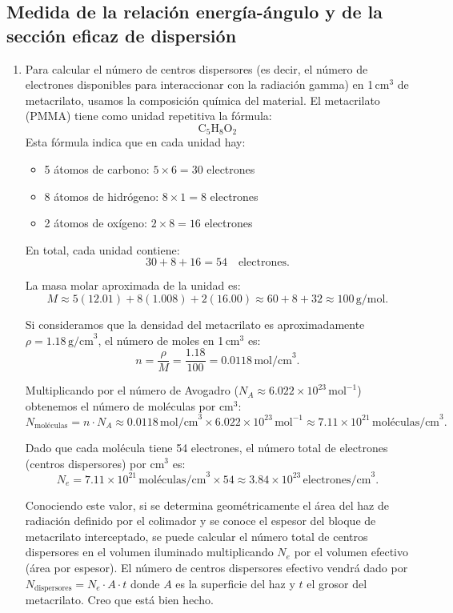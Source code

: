 \documentclass[11pt]{article}
\begin{document}
\subsection{Medida de la relación energía-ángulo y de la sección eficaz de dispersión}

\begin{enumerate}[label=\alph*)]
    \item 
    Para calcular el número de centros dispersores (es decir, el número de electrones disponibles para interaccionar con la radiación gamma) en 1\,cm$^3$ de metacrilato, usamos la composición química del material. El metacrilato (PMMA) tiene como unidad repetitiva la fórmula:
    \[
    \mathrm{C_5H_8O_2}
    \]
    Esta fórmula indica que en cada unidad hay:
    \begin{itemize}
    \item 5 átomos de carbono: \(5 \times 6 = 30\) electrones  
    \item 8 átomos de hidrógeno: \(8 \times 1 = 8\) electrones  
    \item 2 átomos de oxígeno: \(2 \times 8 = 16\) electrones
    \end{itemize}
    En total, cada unidad contiene:
    \[
    30 + 8 + 16 = 54 \quad \text{electrones.}
    \]
    
    La masa molar aproximada de la unidad es:
    \[
    M \approx 5(12.01) + 8(1.008) + 2(16.00) \approx 60 + 8 + 32 \approx 100 \, \text{g/mol}.
    \]
    
    Si consideramos que la densidad del metacrilato es aproximadamente \(\rho = 1.18\, \text{g/cm}^3\), el número de moles en 1\,cm$^3$ es:
    \[
    n = \frac{\rho}{M} = \frac{1.18}{100} = 0.0118\, \text{mol/cm}^3.
    \]
    
    Multiplicando por el número de Avogadro (\(N_A \approx 6.022 \times 10^{23}\, \text{mol}^{-1}\)) obtenemos el número de moléculas por cm$^3$:
    \[
    N_{\text{moléculas}} = n \cdot N_A \approx 0.0118\, \text{mol/cm}^3 \times 6.022 \times 10^{23}\, \text{mol}^{-1} \approx 7.11 \times 10^{21}\, \text{moléculas/cm}^3.
    \]
    
    Dado que cada molécula tiene 54 electrones, el número total de electrones (centros dispersores) por cm$^3$ es:
    \[
    N_e = 7.11 \times 10^{21}\, \text{moléculas/cm}^3 \times 54 \approx 3.84 \times 10^{23}\, \text{electrones/cm}^3.
    \]
    
    Conociendo este valor, si se determina geométricamente el área del haz de radiación definido por el colimador y se conoce el espesor del bloque de metacrilato interceptado, se puede calcular el número total de centros dispersores en el volumen iluminado multiplicando \(N_e\) por el volumen efectivo (área por espesor). El número de centros dispersores efectivo vendrá dado por $N_{\text{dispersores}}=N_e \cdot A \cdot t$ donde $A$ es la superficie del haz y $t$ el grosor del metacrilato. \textcolor{BrickRed}{Creo que está bien hecho.}


\end{enumerate}
\end{document}
